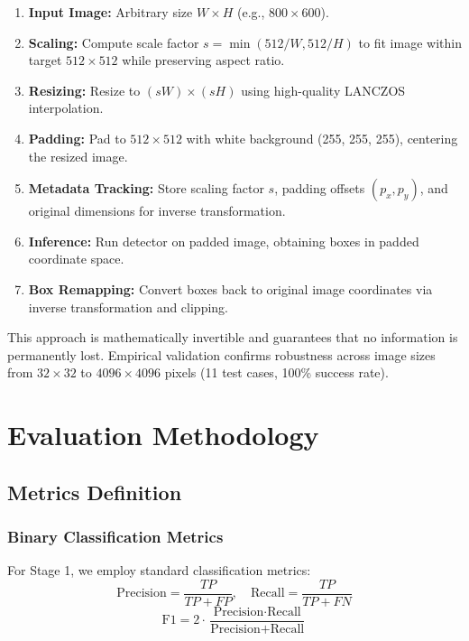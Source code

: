 \documentclass[journal]{IEEEtran}
\begin{document}
\begin{enumerate}
\item \textbf{Input Image:} Arbitrary size $W \times H$ (e.g., $800 \times 600$).
\item \textbf{Scaling:} Compute scale factor $s = \min(512/W, 512/H)$ to fit image within target $512 \times 512$ while preserving aspect ratio.
\item \textbf{Resizing:} Resize to $(sW) \times (sH)$ using high-quality LANCZOS interpolation.
\item \textbf{Padding:} Pad to $512 \times 512$ with white background (255, 255, 255), centering the resized image.
\item \textbf{Metadata Tracking:} Store scaling factor $s$, padding offsets $(p_x, p_y)$, and original dimensions for inverse transformation.
\item \textbf{Inference:} Run detector on padded image, obtaining boxes in padded coordinate space.
\item \textbf{Box Remapping:} Convert boxes back to original image coordinates via inverse transformation and clipping.
\end{enumerate}

This approach is mathematically invertible and guarantees that no information is permanently lost. Empirical validation confirms robustness across image sizes from $32 \times 32$ to $4096 \times 4096$ pixels (11 test cases, 100\% success rate).

\section{Evaluation Methodology}

\subsection{Metrics Definition}

\subsubsection{Binary Classification Metrics}
For Stage 1, we employ standard classification metrics:
\begin{equation}
\text{Precision} = \frac{TP}{TP + FP}, \quad \text{Recall} = \frac{TP}{TP + FN}
\end{equation}
\begin{equation}
\text{F1} = 2 \cdot \frac{\text{Precision} \cdot \text{Recall}}{\text{Precision} + \text{Recall}}
\end{equation}
\end{document}
